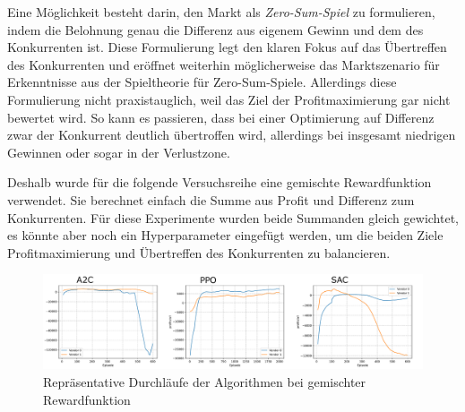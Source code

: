 Eine Möglichkeit besteht darin, den Markt als \textit{Zero-Sum-Spiel} zu formulieren, indem die Belohnung genau die Differenz aus eigenem Gewinn und dem des Konkurrenten ist.
Diese Formulierung legt den klaren Fokus auf das Übertreffen des Konkurrenten und eröffnet weiterhin möglicherweise das Marktszenario für Erkenntnisse aus der Spieltheorie für Zero-Sum-Spiele.
Allerdings diese Formulierung nicht praxistauglich, weil das Ziel der Profitmaximierung gar nicht bewertet wird.
So kann es passieren, dass bei einer Optimierung auf Differenz zwar der Konkurrent deutlich übertroffen wird, allerdings bei insgesamt niedrigen Gewinnen oder sogar in der Verlustzone.

Deshalb wurde für die folgende Versuchsreihe eine gemischte Rewardfunktion verwendet.
Sie berechnet einfach die Summe aus Profit und Differenz zum Konkurrenten.
Für diese Experimente wurden beide Summanden gleich gewichtet, es könnte aber noch ein Hyperparameter eingefügt werden, um die beiden Ziele Profitmaximierung und Übertreffen des Konkurrenten zu balancieren.

\begin{figure}[htbp]
	\centering
	\includegraphics[width=\textwidth]{main/lineplot_mixed_rewards.pdf}
	\caption{Repräsentative Durchläufe der Algorithmen bei gemischter Rewardfunktion}
	\label{graphic:LineplotMixedRewards}
\end{figure}

